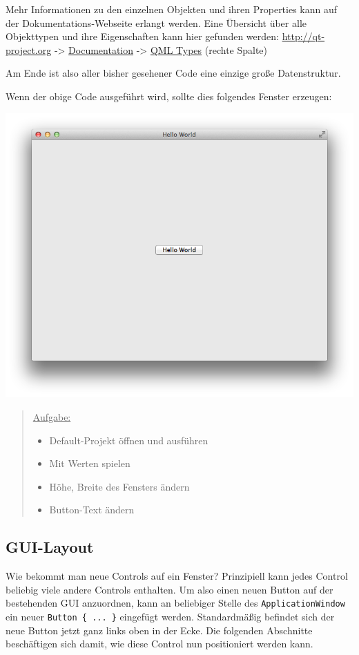 \documentclass[a4paper]{article}
\begin{document}
Mehr Informationen zu den einzelnen Objekten und ihren Properties kann auf der Dokumentations-Webseite erlangt werden. Eine Übersicht über alle Objekttypen und ihre Eigenschaften kann hier gefunden werden: \url{http://qt-project.org} -> \href{http://qt-project.org/doc/}{Documentation} -> \href{http://qt-project.org/doc/qt-5/qmltypes.html}{QML Types} (rechte Spalte)

Am Ende ist also aller bisher gesehener Code eine einzige große Datenstruktur.

Wenn der obige Code ausgeführt wird, sollte dies folgendes Fenster erzeugen:

\includegraphics[width=.9\linewidth]{images/first_template_program.png}

\begin{quote}
\uline{Aufgabe:}
\begin{itemize}
\item Default-Projekt öffnen und ausführen
\item Mit Werten spielen
\item Höhe, Breite des Fensters ändern
\item Button-Text ändern
\end{itemize}
\end{quote}
\subsection{GUI-Layout}
\label{sec-1-2}
Wie bekommt man neue Controls auf ein Fenster? Prinzipiell kann jedes Control beliebig viele andere Controls enthalten. Um also einen neuen Button auf der bestehenden GUI anzuordnen, kann an beliebiger Stelle des \verb~ApplicationWindow~ ein neuer \verb~Button { ... }~ eingefügt werden. Standardmäßig befindet sich der neue Button jetzt ganz links oben in der Ecke. Die folgenden Abschnitte beschäftigen sich damit, wie diese Control nun positioniert werden kann.
\end{document}
